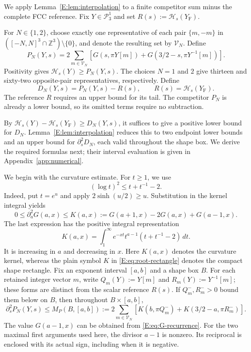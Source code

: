\documentclass[reqno,english]{amsart}
\theoremstyle{definition}
\newtheorem{open problem}[theorem]{Open Problem}
\theoremstyle{remark}
\theoremstyle{plain}
\numberwithin{equation}{section}
\newcommand{\Z}{\mathbb Z}
\newcommand{\YF}{Y_{\mathrm F}}
\newcommand{\HH}{\mathcal H}
\newcommand{\PP}{\mathcal P_3^1}
\begin{document}
We apply Lemma~\ref{E:lem:interpolation} to a finite competitor sum
minus the complete FCC reference. Fix $Y\in\PP$ and set
$R(s):=\HH_s(\YF)$.

For $N\in\{1,2\}$, choose exactly one representative of each pair
$\{m,-m\}$ in $([-N,N]^3\cap\Z^3)\setminus\{0\}$, and denote the
resulting set by $\mathcal V_N$. Define
\begin{equation}
 P_N(Y,s)=2\sum_{m\in\mathcal V_N}
 [G(s,\pi Y[m])+G(3/2-s,\pi Y^{-1}[m])].
 \label{E:eq:finite-ewald}
\end{equation}
Positivity gives $\HH_s(Y)\ge P_N(Y,s)$. The choices $N=1$ and
$2$ give thirteen and sixty-two opposite-pair representatives,
respectively. Define
\[
 D_N(Y,s)=P_N(Y,s)-R(s),\qquad R(s)=\HH_s(\YF).
\]
The reference $R$ requires an upper bound for its tail. The
competitor $P_N$ is already a lower bound, so its omitted terms
require no subtraction.

By $\HH_s(Y)-\HH_s(\YF)\ge D_N(Y,s)$, it suffices to give a
positive lower bound for $D_N$. Lemma~\ref{E:lem:interpolation}
reduces this to two endpoint lower bounds and an upper bound for
$\partial_s^2D_N$, each valid throughout the shape box.
We derive the required formulas next; their interval evaluation is
given in Appendix~\ref{app:numerical}.

We begin with the curvature estimate. For $t\ge1$, we use
\begin{equation}
 (\log t)^2\le t+t^{-1}-2.
 \label{E:eq:log2-bound}
\end{equation}
Indeed, put $t=e^u$ and apply $2\sinh(u/2)\ge u$.
Substitution in the kernel integral yields
\begin{equation}
 0\le\partial_a^2G(a,x)\le
 K(a,x):=G(a+1,x)-2G(a,x)+G(a-1,x).
 \label{E:eq:K-curvature}
\end{equation}
The last expression has the positive integral representation
\[
 K(a,x)=\int_1^\infty e^{-xt}t^{a-1}(t+t^{-1}-2)\,dt.
\]
It is increasing in $a$ and decreasing in $x$. Here $K(a,x)$ denotes
the curvature kernel, whereas the plain symbol $K$ in
\eqref{E:eq:root-rectangle} denotes the compact shape rectangle.
Fix an exponent interval $[a,b]$ and a shape box $B$. For each retained
integer vector $m$, write $Q_m(Y):=Y[m]$ and $R_m(Y):=Y^{-1}[m]$;
these forms are distinct from the scalar reference $R(s)$.
If $Q_m^-,R_m^->0$ bound them below on $B$, then throughout $B\times[a,b]$,
\begin{equation}
 \partial_s^2P_N(Y,s)\le
 M_P(B,[a,b]):=2\sum_{m\in\mathcal V_N}
 [K(b,\pi Q_m^-)+K(3/2-a,\pi R_m^-)].
 \label{E:eq:competitor-curvature}
\end{equation}
The value $G(a-1,x)$ can be obtained from
\eqref{E:eq:G-recurrence}. For the two maximal first arguments
used here, the divisor $a-1$ is nonzero. Its reciprocal is enclosed
with its actual sign, including when it is negative.
\end{document}
